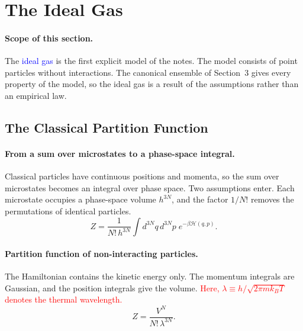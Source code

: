 
\section{The Ideal Gas}

\paragraph{Scope of this section.}
The \textcolor{blue}{ideal gas} is the first explicit model of the notes.
The model consists of point particles without interactions. The canonical
ensemble of Section~3 gives every property of the model, so the ideal gas
is a result of the assumptions rather than an empirical law.

\subsection{The Classical Partition Function}

\paragraph{From a sum over microstates to a phase-space integral.}
Classical particles have continuous positions and momenta, so the sum over
microstates becomes an integral over phase space. Two assumptions enter.
Each microstate occupies a phase-space volume $h^{3N}$, and the factor
$1/N!$ removes the permutations of identical particles.
\begin{equation}
    \boxed{Z=\frac{1}{N!\,h^{3N}}\int d^{3N}q\,d^{3N}p\;e^{-\beta\mathcal{H}(q,p)}.}
\end{equation}

\paragraph{Partition function of non-interacting particles.}
The Hamiltonian contains the kinetic energy only. The momentum integrals
are Gaussian, and the position integrals give the volume.
\textcolor{red}{Here, $\lambda\equiv h/\sqrt{2\pi mk_BT}$ denotes the
thermal wavelength.}
\begin{equation}
    \boxed{Z=\frac{V^N}{N!\,\lambda^{3N}}.}
\end{equation}

